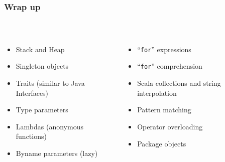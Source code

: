\documentclass[aspectratio=169]{beamer}
\begin{document}
\begin{frame}\frametitle{Wrap up}
~\\[-8mm]
\begin{columns}
\begin{column}{0.48\textwidth}
\begin{itemize}
  \item Stack and Heap
  \item Singleton objects
  \item Traits (similar to Java Interfaces)
  \item Type parameters
  \item Lambdas (anonymous functions)
  \item Byname parameters (lazy)
\end{itemize}
\end{column}
\begin{column}{0.54\textwidth}
\begin{itemize}
  \item ``\texttt{for}'' expressions
  \item ``\texttt{for}'' comprehension
  \item Scala collections and string interpolation
  \item Pattern matching
  \item Operator overloading
  \item Package objects
\end{itemize}
\end{column}
\end{columns}

    


\end{frame}
\end{document}
